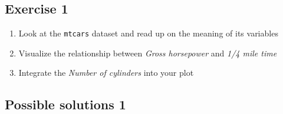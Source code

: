 \documentclass[
  letterpaper,
]{book}
\newenvironment{Shaded}{}{}
\begin{document}
\hypertarget{exercise-1}{%
\subsection{Exercise 1}\label{exercise-1}}

\begin{enumerate}
\def\labelenumi{\arabic{enumi}.}
\item
  Look at the \texttt{mtcars} dataset and read up on the meaning of its
  variables

\begin{Shaded}
\begin{Highlighting}[]

\end{Highlighting}
\end{Shaded}
\item
  Visualize the relationship between \emph{Gross horsepower} and
  \emph{1/4 mile time}

\begin{Shaded}
\begin{Highlighting}[]

\end{Highlighting}
\end{Shaded}
\item
  Integrate the \emph{Number of cylinders} into your plot

\begin{Shaded}
\begin{Highlighting}[]

\end{Highlighting}
\end{Shaded}
\end{enumerate}

\hypertarget{possible-solutions-1}{%
\subsection{Possible solutions 1}\label{possible-solutions-1}}
\end{document}
